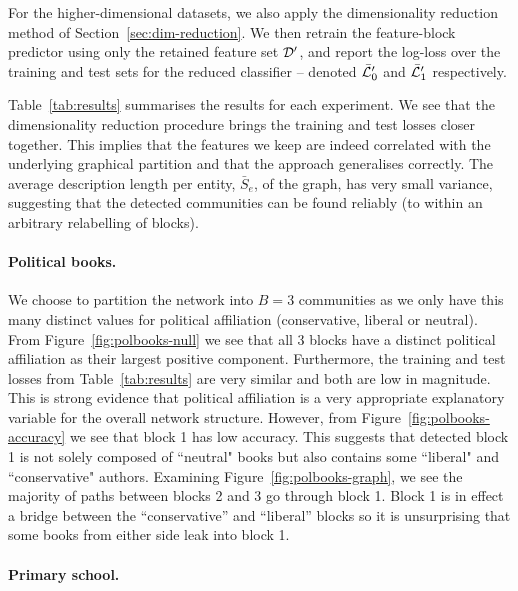 For the higher-dimensional datasets, we also apply the 
dimensionality reduction method 
of Section~\ref{sec:dim-reduction}.  
We then retrain the feature-block predictor using only the retained 
feature set $\mathcal{D}'$, and report the log-loss over the training and 
test sets for the reduced classifier -- 
denoted $\bar{\mathcal{L}}_0'$ and $\bar{\mathcal{L}}_1'$ respectively. 

Table~\ref{tab:results} summarises the results for each experiment.
We see that the dimensionality reduction procedure 
brings the training and test losses closer together. This implies that 
the features we keep are indeed correlated with the underlying graphical 
partition and that the approach generalises correctly.
%
The average description length per entity,
$\bar{S}_e$, of the graph, 
has very small variance, suggesting that
the detected communities can be found reliably (to within an arbitrary 
relabelling of blocks).

\paragraph{\textbf{Political books.}}

We choose to partition the network into $B=3$ communities as we only have this many distinct values for political affiliation (conservative, liberal or neutral).
From Figure~\ref{fig:polbooks-null} we see that all 3 blocks have a distinct political affiliation as their largest positive component.  
Furthermore, the training and test losses from Table~\ref{tab:results}  
are very similar and both are low in magnitude. This is strong evidence 
that political affiliation is a very appropriate explanatory 
variable for the overall network structure.
%
However, from Figure~\ref{fig:polbooks-accuracy} we see that block 1 has low accuracy. 
This suggests that detected block 1 is not solely composed of ``neutral" books but also 
contains some ``liberal" and ``conservative" authors. Examining 
Figure~\ref{fig:polbooks-graph}, we see the majority of paths between blocks 2 and 3 go through block 1.
Block 1 is in effect a bridge between the ``conservative'' and ``liberal'' blocks so it is unsurprising that some books from either side leak into block 1.

\paragraph{\textbf{Primary school.}}

